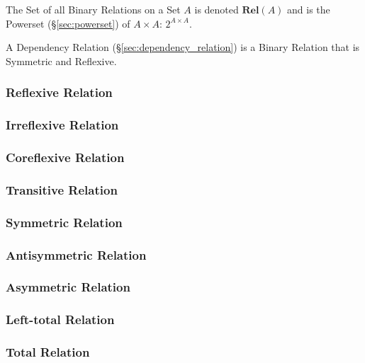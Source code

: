 The Set of all Binary Relations on a Set $A$ is denoted
$\mathbf{Rel}(A)$ and is the Powerset (\S\ref{sec:powerset}) of $A
\times A$: $2^{A \times A}$.

A Dependency Relation (\S\ref{sec:dependency_relation}) is a Binary
Relation that is Symmetric and Reflexive.



\subsubsection{Reflexive Relation}\label{sec:reflexive_relation}

\subsubsection{Irreflexive Relation}\label{sec:irreflexive_relation}

\subsubsection{Coreflexive Relation}\label{sec:coreflexive_relation}

\subsubsection{Transitive Relation}\label{sec:transitive_relation}

\subsubsection{Symmetric Relation}\label{sec:symmetric_relation}

\subsubsection{Antisymmetric Relation}\label{sec:antisymmetric_relation}

\subsubsection{Asymmetric Relation}\label{sec:asymmetric_relation}

\subsubsection{Left-total Relation}\label{sec:left_total}

\subsubsection{Total Relation}\label{sec:total_relation}

